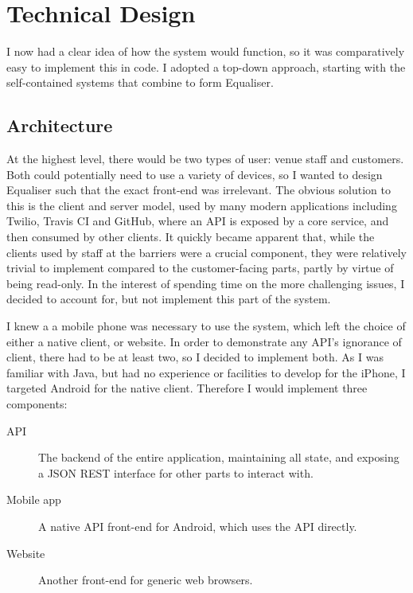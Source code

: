 \documentclass[12pt,a4paper]{bhamdissertation}
\begin{document}
\chapter{Technical Design} \label{technical_design}

I now had a clear idea of how the system would function, so it was comparatively easy to implement this in code. I adopted a top-down approach, starting with the self-contained systems that combine to form Equaliser.

\section{Architecture}

At the highest level, there would be two types of user: venue staff and customers. Both could potentially need to use a variety of devices, so I wanted to design Equaliser such that the exact front-end was irrelevant. The obvious solution to this is the client and server model, used by many modern applications including Twilio, Travis CI and GitHub, where an API is exposed by a core service, and then consumed by other clients. It quickly became apparent that, while the clients used by staff at the barriers were a crucial component, they were relatively trivial to implement compared to the customer-facing parts, partly by virtue of being read-only. In the interest of spending time on the more challenging issues, I decided to account for, but not implement this part of the system.

I knew a a mobile phone was necessary to use the system, which left the choice of either a native client, or website. In order to demonstrate any API's ignorance of client, there had to be at least two, so I decided to implement both. As I was familiar with Java, but had no experience or facilities to develop for the iPhone, I targeted Android for the native client. Therefore I would implement three components:

\begin{description}
    \item[API] The backend of the entire application, maintaining all state, and exposing a JSON REST interface for other parts to interact with.
    \item[Mobile app] A native API front-end for Android, which uses the API directly.
    \item[Website] Another front-end for generic web browsers.
\end{description}
\end{document}
